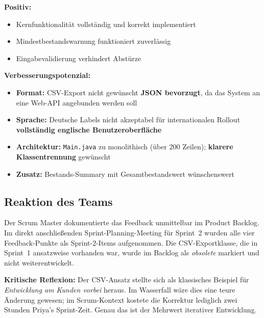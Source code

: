 \documentclass[12pt, a4paper, twoside]{report}
\begin{document}
\begin{infobox}
  \textbf{Positiv:}
  \begin{itemize}[leftmargin=1.2em, itemsep=2pt]
    \item Kernfunktionalität vollständig und korrekt implementiert
    \item Mindestbestandswarnung funktioniert zuverlässig
    \item Eingabevalidierung verhindert Abstürze
  \end{itemize}

  \textbf{Verbesserungspotenzial:}
  \begin{itemize}[leftmargin=1.2em, itemsep=2pt]
    \item \textbf{Format:} CSV-Export nicht gewünscht \textrightarrow{} \textbf{JSON bevorzugt},
          da das System an eine Web-API angebunden werden soll
    \item \textbf{Sprache:} Deutsche Labels nicht akzeptabel für internationalen Rollout
          \textrightarrow{} \textbf{vollständig englische Benutzeroberfläche}
    \item \textbf{Architektur:} \texttt{Main.java} zu monolithisch (über 200 Zeilen);
          \textbf{klarere Klassen\-trennung} gewünscht
    \item \textbf{Zusatz:} Bestands-Summary mit Gesamtbestandswert wünschenswert
  \end{itemize}
\end{infobox}

\subsection{Reaktion des Teams}

Der Scrum Master dokumentierte das Feedback unmittelbar im Product Backlog. Im direkt
anschließenden Sprint-Planning-Meeting für Sprint~2 wurden alle vier Feedback-Punkte als
Sprint-2-Items aufgenommen. Die CSV-Exportklasse, die in Sprint~1 ansatzweise vorhanden war,
wurde im Backlog als \textit{obsolete} markiert und nicht weiterentwickelt.

\begin{warningbox}
  \textbf{Kritische Reflexion:} Der CSV-Ansatz stellte sich als klassisches Beispiel für
  \textit{Entwicklung am Kunden vorbei} heraus. Im Wasserfall wäre dies eine teure Änderung
  gewesen; im Scrum-Kontext kostete die Korrektur lediglich zwei Stunden Priya's Sprint-Zeit.
  Genau das ist der Mehrwert iterativer Entwicklung.
\end{warningbox}
\end{document}
